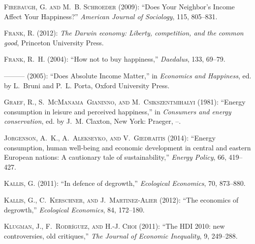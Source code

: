 \documentclass[10pt, letterpaper]{article}
\begin{document}
\begin{spacing}{1.4}
\begin{thebibliography}{36}
\textsc{Firebaugh, G. and M.~B. Schroeder} (2009): \enquote{Does Your
  Neighbor's Income Affect Your Happiness?} \emph{American Journal of
  Sociology}, 115, 805--831.

\textsc{Frank, R.} (2012): \emph{The Darwin economy: Liberty, competition, and
  the common good}, Princeton University Press.

\textsc{Frank, R.~H.} (2004): \enquote{How not to buy happiness,}
  \emph{Daedalus}, 133, 69--79.

---\hspace{-.1pt}---\hspace{-.1pt}--- (2005): \enquote{Does Absolute Income
  Matter,} in \emph{Economics and Happiness}, ed. by L.~Bruni and P.~L. Porta,
  Oxford University Press.

\textsc{Graef, R., S.~McManama~Gianinno, and M.~Csikszentmihalyi} (1981):
  \enquote{Energy consumption in leisure and perceived happiness,} in
  \emph{Consumers and energy conservation}, ed. by J.~M. Claxton, New York:
  Praeger, --.

\textsc{Jorgenson, A.~K., A.~Alekseyko, and V.~Giedraitis} (2014):
  \enquote{Energy consumption, human well-being and economic development in
  central and eastern European nations: A cautionary tale of sustainability,}
  \emph{Energy Policy}, 66, 419--427.

\textsc{Kallis, G.} (2011): \enquote{In defence of degrowth,} \emph{Ecological
  Economics}, 70, 873--880.

\textsc{Kallis, G., C.~Kerschner, and J.~Martinez-Alier} (2012): \enquote{The
  economics of degrowth,} \emph{Ecological Economics}, 84, 172--180.

\textsc{Klugman, J., F.~Rodr{\'\i}guez, and H.-J. Choi} (2011): \enquote{The
  HDI 2010: new controversies, old critiques,} \emph{The Journal of Economic
  Inequality}, 9, 249--288.


\end{thebibliography}
\end{spacing}
\end{document}
